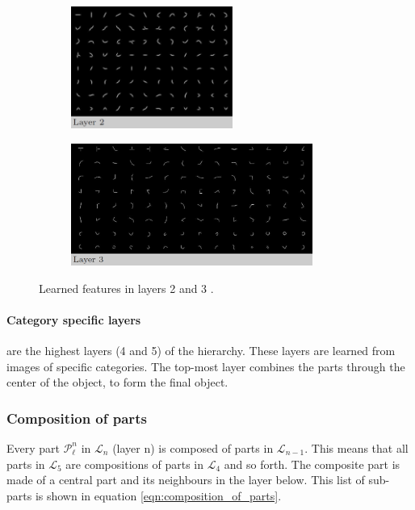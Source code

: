 \begin{figure}[h!] %
	\centering
\begin{subfigure}[b]{0.3\textwidth}
	\includegraphics[height=4cm]{graphics/layer2_features}
\end{subfigure}
\hspace{1cm}
\begin{subfigure}[b]{0.3\textwidth}
	\includegraphics[height=4cm]{graphics/layer3_features}
\end{subfigure}
\caption[Learned features in layers 2 and 3]{Learned features in layers 2 and 3 \citep[fig.~7]{fidler2009learning}.}
\label{fig:layer2+3}
\end{figure}

\paragraph*{Category specific layers} are the highest layers (4 and 5) of the hierarchy.
These layers are learned from images of specific categories.
The top-most layer combines the parts through the center of the object, to form the final object. 

\subsubsection{Composition of parts}
\label{sec:composition-of-parts}
Every part $\mathcal{P}_{\ell}^n$  in $\mathcal{L}_n$ (layer n) is composed of parts in $\mathcal{L}_{n-1}$.
This means that all parts in $\mathcal{L}_5$ are compositions of parts in $\mathcal{L}_4$ and so forth.
The composite part is made of a central part and its neighbours in the layer below. 
This list of sub-parts is shown in equation \ref{eqn:composition_of_parts}. 

